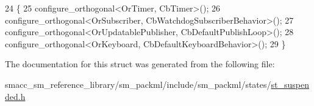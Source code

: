 \begin{DoxyCode}
24     \{
25         configure\_orthogonal<OrTimer, CbTimer>();   
26         configure\_orthogonal<OrSubscriber, CbWatchdogSubscriberBehavior>();
27         configure\_orthogonal<OrUpdatablePublisher, CbDefaultPublishLoop>();
28         configure\_orthogonal<OrKeyboard, CbDefaultKeyboardBehavior>();
29     \}
\end{DoxyCode}


The documentation for this struct was generated from the following file\+:\begin{DoxyCompactItemize}
\item 
smacc\+\_\+sm\+\_\+reference\+\_\+library/sm\+\_\+packml/include/sm\+\_\+packml/states/\hyperlink{st__suspended_8h}{st\+\_\+suspended.\+h}\end{DoxyCompactItemize}
